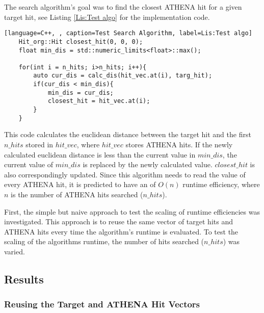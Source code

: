  The search algorithm's goal was to find the closest ATHENA hit for a given target hit, see Listing \ref{Lis:Test algo} for the implementation code.

\begin{lstlisting}[language=C++, , caption=Test Search Algorithm, label=Lis:Test algo]
    Hit_org::Hit closest_hit(0, 0, 0);
    float min_dis = std::numeric_limits<float>::max();

    for(int i = n_hits; i>n_hits; i++){
        auto cur_dis = calc_dis(hit_vec.at(i), targ_hit);
        if(cur_dis < min_dis){
            min_dis = cur_dis;
            closest_hit = hit_vec.at(i);
        }
    }
\end{lstlisting}

This code calculates the euclidean distance between the target hit and the first $n\_hits$ stored in $hit\_vec$, where $hit\_vec$ stores ATHENA hits. If the newly calculated euclidean distance is less than the current value in $min\_dis$, the current value of $min\_dis$ is replaced by the newly calculated value. $closest\_hit$ is also correspondingly updated. Since this algorithm needs to read the value of every ATHENA hit, it is predicted to have an of $O(n)$ runtime efficiency, where $n$ is the number of ATHENA hits searched ($n\_hits$).

First, the simple but naive approach to test the scaling of runtime efficiencies was investigated. This approach is to reuse the same vector of target hits and ATHENA hits every time the algorithm's runtime is evaluated. To test the scaling of the algorithms runtime, the number of hits searched ($n\_hits$) was varied.

\subsection{Results}
\subsubsection{Reusing the Target and ATHENA Hit Vectors}
 
